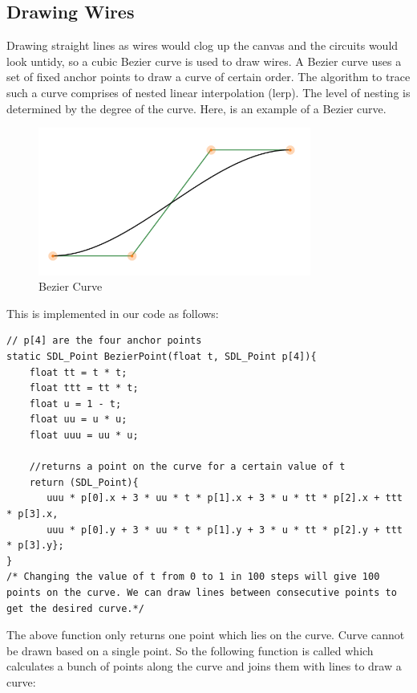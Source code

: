 \documentclass[report]{subfiles}
\begin{document}
	\subsection{Drawing Wires}
     Drawing straight lines as wires would clog up the canvas and the circuits would look untidy, so a cubic Bezier curve is used to draw wires. A Bezier curve uses a set of fixed anchor points to draw a curve of certain order. The algorithm to trace such a curve comprises of nested linear interpolation (lerp). The level of nesting is determined by the degree of the curve. Here, is an example of a Bezier curve.
	 \begin{figure}[H]
        \centering
        \includegraphics[width=0.8\textwidth]{graphics/bezier_curve.png}
        \caption{Bezier Curve}
	\end{figure}
This is implemented in our code as follows:
\begin{lstlisting}
// p[4] are the four anchor points
static SDL_Point BezierPoint(float t, SDL_Point p[4]){
    float tt = t * t;
    float ttt = tt * t;
    float u = 1 - t;
    float uu = u * u;
    float uuu = uu * u;

	//returns a point on the curve for a certain value of t
    return (SDL_Point){
       uuu * p[0].x + 3 * uu * t * p[1].x + 3 * u * tt * p[2].x + ttt * p[3].x,
       uuu * p[0].y + 3 * uu * t * p[1].y + 3 * u * tt * p[2].y + ttt * p[3].y};
}
/* Changing the value of t from 0 to 1 in 100 steps will give 100 points on the curve. We can draw lines between consecutive points to get the desired curve.*/
\end{lstlisting}
The above function only returns one point which lies on the curve. Curve cannot be drawn based on a single point. So the following function is called which calculates a bunch of points along the curve and joins them with lines to draw a curve:
\end{document}
